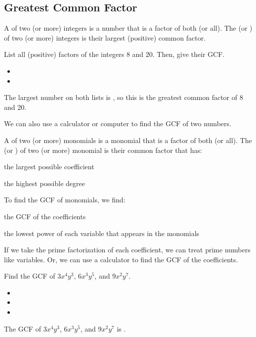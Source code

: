 \subsection{Greatest Common Factor}
\begin{definition}
A  of two (or more) integers is a number that is a factor of both (or all). The  (or ) of two (or more) integers is their largest (positive) common factor.
\end{definition}
\begin{Example}
List all (positive) factors of the integers $8$ and $20$. Then, give their GCF.
\begin{itemize}
\item{}
\item{}
\end{itemize}
The largest number on both lists is \makeblanksmall, so this is the greatest common factor of 8 and 20.
\end{Example}
\noindent We can also use a calculator or computer to find the GCF of two numbers.
\begin{definition}
A  of two (or more) monomials is a monomial that is a factor of both (or all). The  (or ) of two (or more) monomial is their common factor that has:
\begin{itemize*}
\item the largest possible coefficient
\item the highest possible degree
\end{itemize*}
\end{definition}
To find the GCF of monomials, we find:
\begin{itemize*}
\item the GCF of the coefficients
\item the lowest power of each variable that appears in the monomials
\end{itemize*}
If we take the prime factorization of each coefficient, we can treat prime numbers like variables. Or, we can use a calculator to find the GCF of the coefficients.
\begin{Example}
Find the GCF of $3x^4y^3$, $6x^3y^5$, and $9x^2y^7$.
\begin{itemize}
\item{}
\item{}
\item{}
\end{itemize}
The GCF of $3x^4y^3$, $6x^3y^5$, and $9x^2y^7$ is \makeblanksmall.
\end{Example}